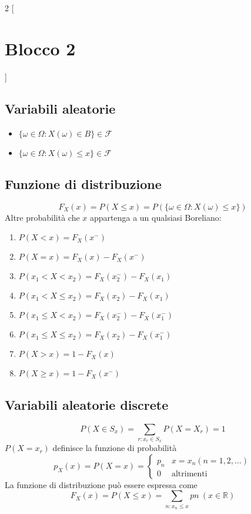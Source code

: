 \begin{multicols*}{2}
[\section*{Blocco 2}]

\subsection*{Variabili aleatorie}
\begin{itemize}
    \item $\{\omega \in \Omega : X(\omega) \in B\} \in \mathscr{F}$
    \item $\{\omega \in \Omega : X(\omega) \le x\} \in \mathscr{F}$
\end{itemize}

\subsection*{Funzione di distribuzione}
$$
F_X(x) = P(X \le x) = P(\{\omega \in \Omega : X(\omega) \le x\})
$$
Altre probabilità che $x$ appartenga a un qualsiasi Boreliano:
\begin{enumerate}
    \item $P(X < x) = F_X(x^-)$
    \item $P(X = x) = F_X(x) - F_X(x^-)$
    \item $P(x_1 < X < x_2) = F_X(x_2^-) - F_X(x_1)$
    \item $P(x_1 < X \le x_2) = F_X(x_2) - F_X(x_1)$
    \item $P(x_1 \le X < x_2) = F_X(x_2^-) - F_X(x_1^-)$
    \item $P(x_1 \le X \le x_2) = F_X(x_2) - F_X(x_1^-)$
    \item $P(X > x) = 1 - F_X(x)$
    \item $P(X \ge x) = 1 - F_X(x^-)$
\end{enumerate}

\subsection*{Variabili aleatorie discrete}
$$
P(X \in S_x) = \sum_{r : x_r \in S_x}P(X = X_r) = 1
$$
$P(X = x_r)$ definisce la funzione di probabilità
$$
p_X(x) = P(X = x) =
\begin{cases}
    p_n & x = x_n (n = 1,2,\dots)\\
    0 & \text{altrimenti}
\end{cases}
$$
La funzione di distribuzione può essere espressa come
$$
F_X(x) = P(X \le x) = \sum_{n: x_n \le x} pn \ (x \in \mathbb{R})
$$


\end{multicols*}

